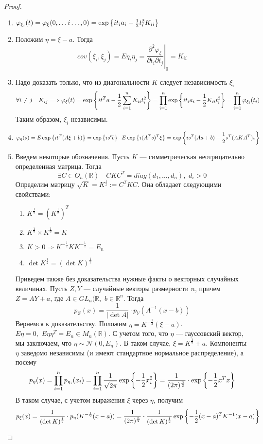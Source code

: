 \documentclass[12pt, russian]{article}
\begin{document}
\begin{proof}
$ $
\begin{enumerate}
\item $\varphi_{\xi_i}(t) = \varphi_\xi(0,\ldots i \ldots, 0) = \exp{\left\{{it_i a_i - \frac{1}{2}t_i^2K_{ii}}\right\}}$
\item Положим $\eta = \xi - a$. Тогда 
$$ cov(\xi_i, \xi_j) = E\eta_i\eta_j = \left.\frac{\partial^2 \varphi_\xi}{\partial t_i \partial t_j}\right|_0 = K_{ii}$$
\item Надо доказать только, что из диагональности $K$ следует независимость $\xi_i$
$$ \forall i \not= j\quad K_{ij} \Longrightarrow \varphi_\xi(t) = \exp{\left\{{it^Ta - \frac{1}{2}\sum\limits_{i=1}^n{K_{ii}t_i^2}}\right\}} = \prod\limits_{i=1}^n{\exp{\left\{{it_i a_i - \frac{1}{2} K_{ii}t_i^2}\right\}}} = \prod\limits_{i=1}^n{\varphi_{\xi_i}(t_i)}$$
Таким образом, $\xi_i$ независимы.
\item 
$$ \varphi_\eta(s) = E\exp{\left\{{it^T(A\xi + b)}\right\}} = \exp{\left\{{is^tb}\right\}}\cdot E\exp{\left\{{i(A^Ts)^T\xi}\right\}} = \exp{\left\{{is^T(Aa + b) -\frac{1}{2}s^T(AKA^T)s}\right\}}$$
\item Введем некоторые обозначения. Пусть $K$ --- симметрическая неотрицательно определенная матрица. Тогда 
$$ \exists C \in O_n(\mathbb{R}) \quad CKC^T = diag(d_1,\ldots,d_n),\,\,d_i > 0 $$
Определим матрицу $\sqrt{K} = K^\frac{1}{2} := C^TKC$. Она обладает следующими свойствами:
\begin{enumerate}
\item $K^\frac{1}{2} = (K^\frac{1}{2})^T$
\item $K^\frac{1}{2} \times K^\frac{1}{2} = K$
\item $K > 0 \Rightarrow K^{-\frac{1}{2}}KK^{-\frac{1}{2}} = E_n$
\item $\det{K^\frac{1}{2}} = (\det{K})^\frac{1}{2}$
\end{enumerate}

Приведем также без доказательства нужные факты о векторных случайных величинах. Пусть $Z, Y$ --- случайные векторы размерности $n$, причем $Z = AY + a$, где $A\in GL_n(\mathbb{R},\,\,b\in\mathbb{R}^n$. Тогда
$$ p_Z(x) = \frac{1}{|\det{A}|}\cdot p_Y(A^{-1}(x - b)) $$
Вернемся к доказательству. Положим $\eta = K^{-\frac{1}{2}}(\xi - a)$. $E\eta = 0,\,\,E\eta\eta^T = E_n\in M_n(\mathbb{R})$. С учетом того, что $\eta$ --- гауссовский вектор, мы заключаем, что $\eta \sim \mathcal{N}(0, E_n)$. В таком случае, $\xi = K^\frac{1}{2} + a$. Компоненты $\eta$ заведомо независимы (и имеют стандартное нормальное распределение), а посему
$$ p_\eta(x) = \prod\limits_{i=1}^n{p_{\eta_i}(x_i)} = \prod\limits_{i=1}^n{\frac{1}{\sqrt{2\pi}} \exp{\left\{{-\frac{1}{2}x_i^2}\right\}}} = \frac{1}{(2\pi)^\frac{n}{2}} \cdot\exp{\left\{{-\frac{1}{2}x^T x}\right\}}$$
В таком случае, с учетом выражения $\xi$ через $\eta$, получим
$$ p_\xi(x) = \frac{1}{(\det{K})^\frac{1}{2}}\cdot p_\eta(K^{-\frac{1}{2}} (x - a)) = \frac{1}{(2\pi)^\frac{n}{2}}\cdot \frac{1}{(\det{K})^\frac{1}{2}} \exp{\left\{{-\frac{1}{2} (x-a)^TK^{-1}(x-a)}\right\}}$$ 

\end{enumerate}
\end{proof}
\end{document}
